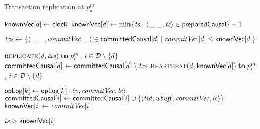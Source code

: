 
\begin{algorithm*}[t]
  \caption{Transaction replication at $p^m_d$}
  \label{alg:unistore-replication}
  \begin{algorithmic}[1]
    \Function{\propagate}{\null} 
      \label{line:function-propagate}
      \If{$\preparedcausal = \emptyset$}
          \label{line:propagate-preparedcausal-empty}
        \State ${\sf knownVec}[d] \gets {\sf clock}$
          \label{line:propagate-knownvc-clock}
      \Else
        \State ${\sf knownVec}[d] \gets
          \min\{\mathit{ts} \mid \langle \_, \_, \mathit{ts} \rangle \in {\sf preparedCausal}\} - 1$
        \label{line:propagate-knownvc-ts}
      \EndIf

      \hStatex
      \State \var $\mathit{txs} \gets \{\langle \_, \_, \mathit{commitVec}, \textcolor{blue}{\_}
        \rangle \in {\sf committedCausal}[d] \mid \mathit{commitVec}[d] \le {\sf knownVec}[d]\}$
        \label{line:propagate-txs}

      \If{$\txsvar \neq \emptyset$}
        \label{line:propagate-txs-nonempty}
        \State \send $\textsc{replicate}(d, \mathit{txs}) \;{\bf to}\; p^{m}_{i}$,
          $i \in \mathcal{D} \setminus \{d\}$
          \label{line:propagate-call-replicate}
        \State ${\sf committedCausal}[d] \gets {\sf committedCausal}[d] \setminus \mathit{txs}$
          \label{line:propagate-committedblue}
      \Else
        \State \send $\textsc{heartbeat}(d, {\sf knownVec}[d]) \;{\bf to}\; p^{m}_{i}$,
          $i \in \mathcal{D} \setminus \{d\}$
          \label{line:propagate-call-heartbeat}
      \EndIf
    \EndFunction

    \Statex
      \label{line:function-replicate}
        \label{line:replicate-increasing-order}
        \If{$\commitvc[i] > \knownVC[i]$}
          \label{line:replicate-precondition}
            \State ${\sf opLog}[k] \gets {\sf opLog}[k] \cdot {\langle v, \mathit{commitVec}, \textcolor{blue}{\mathit{lc}} \rangle}$
            \label{line:replicate-oplog}
          \EndFor
          \State ${\sf committedCausal}[i] \gets {\sf committedCausal}[i] \cup
            \{\langle \mathit{tid}, \mathit{wbuff}, \mathit{commitVec}, \textcolor{blue}{\mathit{lc}} \rangle\}$
            \label{line:replicate-committedcausal}
          \State ${\sf knownVec}[i] \gets \mathit{commitVec}[i]$
            \label{line:replicate-knownvc}
        \EndIf
      \EndFor
    \EndWhenRcv

    \Statex
      \label{line:function-heartbeat}
      \State \pre $\mathit{ts} > {\sf knownVec}[i]$
        \label{line:heartbeat-precondition}


\end{algorithmic}
\end{algorithm*}

